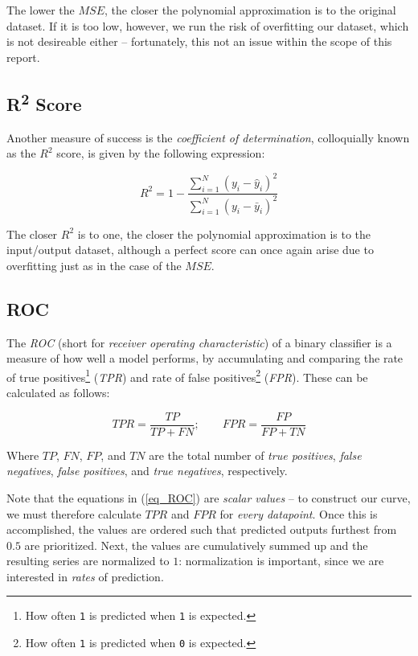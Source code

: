 \documentclass[a4paper,10pt,english]{article}
\begin{document}
\begin{multicols*}{2}
The lower the $MSE$, the closer the polynomial approximation is to the original dataset.  If it is too low, however, we run the risk of overfitting our dataset, which is not desireable either – fortunately, this not an issue within the scope of this report.

\subsection*{R\textsuperscript{2} Score}

Another measure of success is the \textit{coefficient of determination}, colloquially known as the $R^2$ score, is given by the following expression:

\begin{equation*}
R^2 = 1 - \frac{\sum_{i=1}^N (y_i - \hat{y}_i)^2 }{\sum_{i=1}^N (y_i - \bar{y}_i)^2 }
\end{equation*}

The closer $R^2$ is to one, the closer the polynomial approximation is to the input/output dataset, although a perfect score can once again arise due to overfitting just as in the case of the $MSE$.

\subsection*{ROC}

The \textit{ROC} (short for \textit{receiver operating characteristic}) of a binary classifier is a measure of how well a model performs, by accumulating and comparing the rate of true positives\footnote{How often \texttt{1} is predicted when \texttt{1} is expected.} (\textit{TPR})
 and rate of false positives\footnote{How often \texttt{1} is predicted when \texttt{0} is expected.} (\textit{FPR}). These can be calculated as follows:

\begin{equation}
\label{eq_ROC}
TPR = \frac{TP}{TP + FN}; \qquad FPR = \frac{FP}{FP + TN}
\end{equation}

Where $TP$, $FN$, $FP$, and $TN$ are the total number of \textit{true positives}, \textit{false negatives}, \textit{false positives}, and \textit{true negatives}, respectively.

Note that the equations in (\ref{eq_ROC}) are \textit{scalar values} – to construct our curve, we must therefore calculate $TPR$ and $FPR$ for \textit{every datapoint}. Once this is accomplished, the values are ordered such that predicted outputs furthest from $0.5$ are prioritized.  Next, the values are cumulatively summed up and the resulting series are normalized to $1$: normalization is important, since we are interested in \textit{rates} of prediction.


\end{multicols*}
\end{document}
